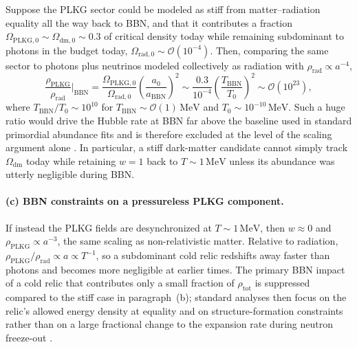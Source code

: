 Suppose the PLKG sector could be modeled as stiff from matter--radiation equality all the way back to BBN, and that it contributes a fraction $\Omega_{\mathrm{PLKG},0}\sim\Omega_{\mathrm{dm},0}\sim 0.3$ of critical density today while remaining subdominant to photons in the budget today, $\Omega_{\mathrm{rad},0}\sim\mathcal{O}(10^{-4})$.
Then, comparing the same sector to photons plus neutrinos modeled collectively as radiation with $\rho_{\mathrm{rad}}\propto a^{-4}$,
\begin{equation}
\frac{\rho_{\mathrm{PLKG}}}{\rho_{\mathrm{rad}}}\Big|_{\mathrm{BBN}}
=\frac{\Omega_{\mathrm{PLKG},0}}{\Omega_{\mathrm{rad},0}}
\left(\frac{a_0}{a_{\mathrm{BBN}}}\right)^{2}
\sim\frac{0.3}{10^{-4}}\left(\frac{T_{\mathrm{BBN}}}{T_0}\right)^{2}
\sim\mathcal{O}(10^{23}),
\label{eq:stiff-bbn-disaster}
\end{equation}
where $T_{\mathrm{BBN}}/T_0\sim 10^{10}$ for $T_{\mathrm{BBN}}\sim\mathcal{O}(1)\,\mathrm{MeV}$ and $T_0\sim 10^{-10}\,\mathrm{MeV}$.
Such a huge ratio would drive the Hubble rate at BBN far above the baseline used in standard primordial abundance fits and is therefore excluded at the level of the scaling argument alone \cite{Cyburt2016}.
In particular, a stiff dark-matter candidate cannot simply track $\Omega_{\mathrm{dm}}$ today while retaining $w=1$ back to $T\sim 1\,\mathrm{MeV}$ unless its abundance was utterly negligible during BBN.

\paragraph{(c) BBN constraints on a pressureless PLKG component.}
If instead the PLKG fields are desynchronized at $T\sim 1\,\mathrm{MeV}$, then $w\approx 0$ and $\rho_{\mathrm{PLKG}}\propto a^{-3}$, the same scaling as non-relativistic matter.
Relative to radiation, $\rho_{\mathrm{PLKG}}/\rho_{\mathrm{rad}}\propto a\propto T^{-1}$, so a subdominant cold relic redshifts away faster than photons and becomes more negligible at earlier times.
The primary BBN impact of a cold relic that contributes only a small fraction of $\rho_{\mathrm{tot}}$ is suppressed compared to the stiff case in paragraph~(b); standard analyses then focus on the relic's allowed energy density at equality and on structure-formation constraints rather than on a large fractional change to the expansion rate during neutron freeze-out \cite{Cyburt2016}.

